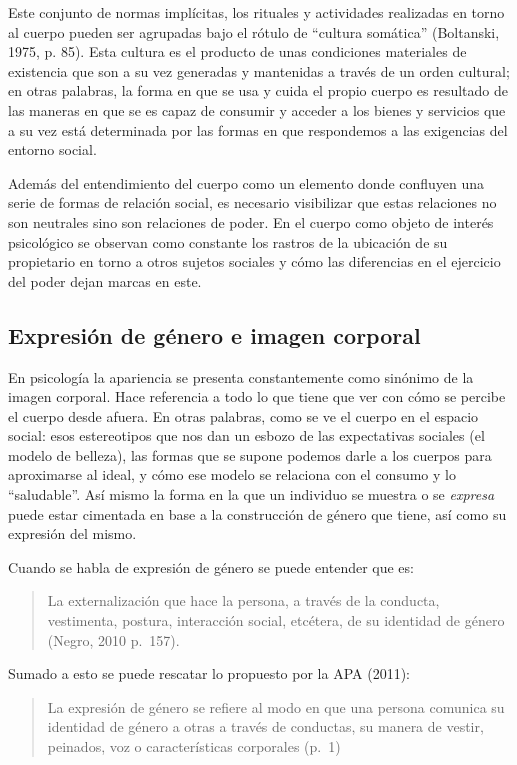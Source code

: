 Este conjunto de normas implícitas, los rituales y actividades realizadas en
torno al cuerpo pueden ser agrupadas bajo el rótulo de “cultura somática”
(Boltanski, 1975, p. 85).
Esta cultura es el producto de unas condiciones materiales de existencia que son
a su vez generadas y mantenidas a través de un orden cultural;
en otras palabras, la forma en que se usa y cuida el propio cuerpo es
resultado de las maneras en que se es capaz de consumir y acceder a los
bienes y servicios que a su vez está determinada por las formas en que
respondemos a las exigencias del entorno social.

Además del entendimiento del cuerpo como un elemento donde confluyen una serie
de formas de relación social, es necesario visibilizar que estas relaciones no
son neutrales sino son relaciones de poder.
En el cuerpo como objeto de interés psicológico se observan como constante los
rastros de la ubicación de su propietario en torno a otros sujetos sociales y
cómo las diferencias en el ejercicio del poder dejan marcas en este.

\subsection{Expresión de género e imagen corporal}
En psicología la apariencia se presenta constantemente como sinónimo de la
imagen corporal.
Hace referencia a todo lo que tiene que ver con cómo se percibe el cuerpo desde
afuera.
En otras palabras, como se ve el cuerpo en el espacio social: esos estereotipos
que nos dan un esbozo de las expectativas sociales (el modelo de belleza), las
formas que se supone podemos darle a los cuerpos para aproximarse al ideal, y
cómo ese modelo se relaciona con el consumo y lo “saludable”.
Así mismo la forma en la que un individuo se muestra o se \emph{expresa} puede
estar
cimentada en base a la construcción de género que tiene, así como su expresión
del mismo.

Cuando se habla de expresión de género se puede entender que es:

\begin{quote}
    La externalización que hace la persona, a través de la conducta, vestimenta,
    postura, interacción social, etcétera, de su identidad de género (Negro, 2010 p.~157).
\end{quote}

Sumado a esto se puede rescatar lo propuesto por la APA (2011):

\begin{quote}
    La expresión de género se refiere al modo en que una persona comunica su
    identidad de género a otras a través de conductas, su manera de vestir,
    peinados, voz o características corporales (p.~1)
\end{quote}

